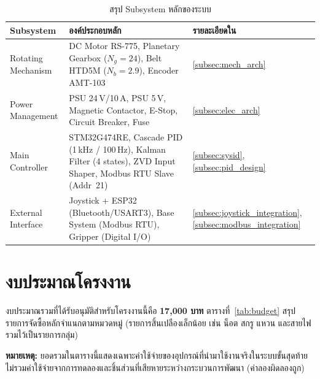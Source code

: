 \begin{table}[H]
  \centering
  \caption{สรุป Subsystem หลักของระบบ}
  \label{tab:subsystem_summary}
  \small
  \begin{tabular}{>{\raggedright\arraybackslash}p{3.0cm} >{\raggedright\arraybackslash}p{6.5cm} >{\raggedright\arraybackslash}p{4.0cm}}
    \toprule
    \textbf{Subsystem} & \textbf{องค์ประกอบหลัก} & \textbf{รายละเอียดใน} \\
    \midrule
    Rotating Mechanism
      & \raggedright DC Motor RS-775, Planetary Gearbox ($N_g{=}24$),
        Belt HTD5M ($N_b{=}2.9$), Encoder AMT-103
      & \cref{subsec:mech_arch} \\[0.4em]
    Power Management
      & \raggedright PSU 24\,V/10\,A, PSU 5\,V,
        Magnetic Contactor, E-Stop,
        Circuit Breaker, Fuse
      & \cref{subsec:elec_arch} \\[0.4em]
    Main Controller
      & \raggedright STM32G474RE, Cascade PID (1\,kHz / 100\,Hz),
        Kalman Filter (4 states),
        ZVD Input Shaper,
        Modbus RTU Slave (Addr~21)
      & \cref{subsec:sysid}, \cref{subsec:pid_design} \\[0.4em]
    External Interface
      & \raggedright Joystick + ESP32 (Bluetooth/USART3),
        Base System (Modbus RTU),
        Gripper (Digital I/O)
      & \cref{subsec:joystick_integration}, \cref{subsec:modbus_integration} \\
    \bottomrule
  \end{tabular}
\end{table}

\section{งบประมาณโครงงาน}
\label{sec:budget}

งบประมาณรวมที่ได้รับอนุมัติสำหรับโครงงานนี้คือ \textbf{17{,}000 บาท}
ตารางที่~\ref{tab:budget} สรุปรายการจัดซื้อหลักจำแนกตามหมวดหมู่
(รายการสิ้นเปลืองเล็กน้อย เช่น น็อต สกรู แหวน และสายไฟ รวมไว้เป็นรายการกลุ่ม)

\noindent\textbf{หมายเหตุ:} ยอดรวมในตารางนี้แสดงเฉพาะค่าใช้จ่ายของอุปกรณ์ที่นำมาใช้งานจริงในระบบขั้นสุดท้าย
ไม่รวมค่าใช้จ่ายจากการทดลองและชิ้นส่วนที่เสียหายระหว่างกระบวนการพัฒนา (ค่าลองผิดลองถูก)

